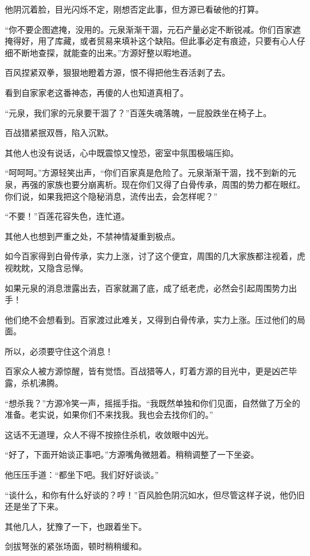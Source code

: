 
\begin{this_body}

他阴沉着脸，目光闪烁不定，刚想否定此事，但方源已看破他的打算。

“你不要企图遮掩，没用的。元泉渐渐干涸，元石产量必定不断锐减。你们百家遮掩得好，用了库藏，或者贸易来填补这个缺陷。但此事必定有痕迹，只要有心人仔细不断地查探，就能查的出来。”方源好整以暇地道。

百风捏紧双拳，狠狠地瞪着方源，恨不得把他生吞活剥了去。

看到自家家老这番神态，再傻的人也知道真相了。

“元泉，我们家的元泉要干涸了？”百莲失魂落魄，一屁股跌坐在椅子上。

百战猎紧抿双唇，陷入沉默。

其他人也没有说话，心中既震惊又惶恐，密室中氛围极端压抑。

“呵呵呵。”方源轻笑出声，“你们百家真是危险了。元泉渐渐干涸，找不到新的元泉，再强的家族也要分崩离析。现在你们又得了白骨传承，周围的势力都在眼红。你们说，如果我把这个隐秘消息，流传出去，会怎样呢？”

“不要！”百莲花容失色，连忙道。

其他人也想到严重之处，不禁神情凝重到极点。

如今百家得到白骨传承，实力上涨，讨了这个便宜，周围的几大家族都注视着，虎视眈眈，又隐含忌惮。

如果元泉的消息泄露出去，百家就漏了底，成了纸老虎，必然会引起周围势力出手！

他们绝不会想看到。百家渡过此难关，又得到白骨传承，实力上涨。压过他们的局面。

所以，必须要守住这个消息！

百家众人被方源惊醒，皆有觉悟。百战猎等人，盯着方源的目光中，更是凶芒毕露，杀机沸腾。

“想杀我？”方源冷笑一声，摇摇手指。“我既然单独和你们见面，自然做了万全的准备。老实说，如果你们不来找我。我也会去找你们的。”

这话不无道理，众人不得不按捺住杀机，收敛眼中凶光。

“好了，下面开始谈正事吧。”方源嘴角微翘着。稍稍调整了一下坐姿。

他压压手道：“都坐下吧。我们好好谈谈。”

“谈什么，和你有什么好谈的？哼！”百风脸色阴沉如水，但尽管这样子说，他仍旧还是坐了下来。

其他几人，犹豫了一下，也跟着坐下。

剑拔弩张的紧张场面，顿时稍稍缓和。


\end{this_body}
